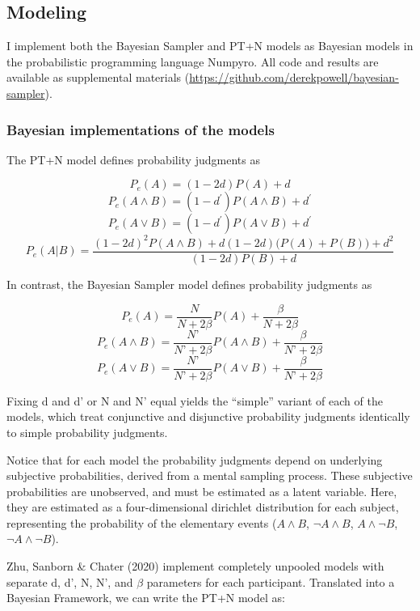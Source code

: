 \documentclass[
  english,
  man,floatsintext]{apa6}
\begin{document}
\hypertarget{modeling}{%
\subsection{Modeling}\label{modeling}}

I implement both the Bayesian Sampler and PT+N models as Bayesian models in the probabilistic programming language Numpyro. All code and results are available as supplemental materials (\url{https://github.com/derekpowell/bayesian-sampler}).

\hypertarget{bayesian-implementations-of-the-models}{%
\subsubsection{Bayesian implementations of the models}\label{bayesian-implementations-of-the-models}}

The PT+N model defines probability judgments as

\[P_{e}(A) = (1-2d)P(A) + d\]
\[P_e(A\land B) = (1-d^\prime)P(A \land B)+d^\prime\]
\[P_e(A\lor B) = (1-d^\prime)P(A \lor B)+d^\prime\]
\[P_e(A|B) = \frac{(1-2d)^2P(A \land B) + d(1-2d)\big(P(A)+P(B)\big)+d^2}{(1-2d)P(B)+d}\]

In contrast, the Bayesian Sampler model defines probability judgments as

\[P_{e}(A) = \frac{N}{N + 2 \beta}P(A) + \frac{\beta}{N+2 \beta}\]
\[P_{e}(A \land B) = \frac{N’}{N’ + 2 \beta}P(A \land B) + \frac{\beta}{N’+2 \beta}\]
\[P_{e}(A \lor B) = \frac{N’}{N’ + 2 \beta}P(A \lor B) + \frac{\beta}{N’+2 \beta}\]

Fixing d and d' or N and N' equal yields the ``simple'' variant of each of the models, which treat conjunctive and disjunctive probability judgments identically to simple probability judgments.

Notice that for each model the probability judgments depend on underlying subjective probabilities, derived from a mental sampling process. These subjective probabilities are unobserved, and must be estimated as a latent variable. Here, they are estimated as a four-dimensional dirichlet distribution for each subject, representing the probability of the elementary events (\(A \land B\), \(\neg A \land B\), \(A \land \neg B\), \(\neg A \land \neg B\)).

Zhu, Sanborn \& Chater (2020) implement completely unpooled models with separate d, d', N, N', and \(\beta\) parameters for each participant. Translated into a Bayesian Framework, we can write the PT+N model as:
\end{document}
